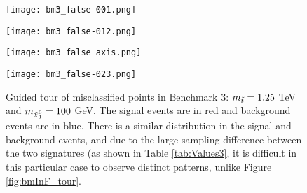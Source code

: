 \begin{figure}[htbp]
\centering
  \begin{minipage}[htbp]{0.4\textwidth}
    \centering
    \texttt{[image: bm3\_false-001.png]}
  \end{minipage}
  \begin{minipage}[htbp]{0.4\textwidth}
    \centering
    \texttt{[image: bm3\_false-012.png]}
  \end{minipage}
  \begin{minipage}[htbp]{0.4\textwidth}
    \centering
    \texttt{[image: bm3\_false\_axis.png]}
  \end{minipage}
  \begin{minipage}[htbp]{0.4\textwidth}
    \centering
    \texttt{[image: bm3\_false-023.png]}
  \end{minipage}
  \caption{Guided tour of misclassified points in Benchmark 3: $m_{\Tilde{t}} = 1.25$ TeV and $m_{\Tilde{\chi}_1^0} = 100$ GeV. The signal events are in red and background events are in blue. There is a similar distribution in the signal and background events, and due to the large sampling difference between the two signatures (as shown in Table \ref{tab:Values3}, it is difficult in this particular case to observe distinct patterns, unlike Figure \ref{fig:bmInF_tour}.}
  \label{fig:bm3F_tour}
\end{figure}
